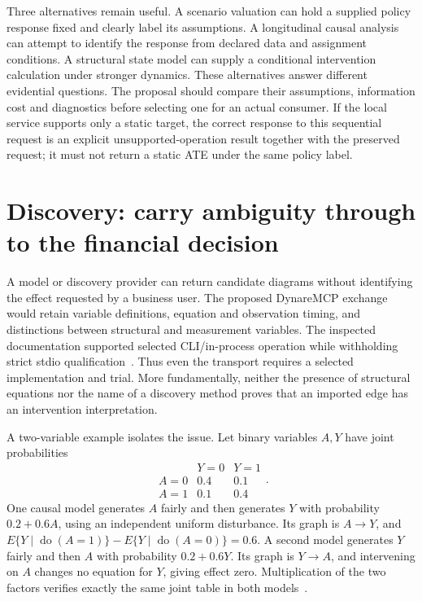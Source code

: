 Three alternatives remain useful. A scenario valuation can hold a supplied
policy response fixed and clearly label its assumptions. A longitudinal
causal analysis can attempt to identify the response from declared data and
assignment conditions. A structural state model can supply a conditional
intervention calculation under stronger dynamics. These alternatives answer
different evidential questions. The proposal should compare their assumptions,
information cost and diagnostics before selecting one for an actual consumer.
If the local service supports only a static target, the correct response to
this sequential request is an explicit unsupported-operation result together
with the preserved request; it must not return a static ATE under the same
policy label.


\section{Discovery: carry ambiguity through to the financial decision}

A model or discovery provider can return candidate diagrams without
identifying the effect requested by a business user. The proposed
DynareMCP exchange would retain variable definitions, equation and observation
timing, and distinctions between structural and measurement variables. The
inspected documentation supported selected CLI/in-process operation while
withholding strict stdio qualification~\citep{v12_in_inventory}. Thus even the
transport requires a selected implementation and trial. More fundamentally,
neither the presence of structural equations nor the name of a discovery
method proves that an imported edge has an intervention interpretation.

A two-variable example isolates the issue. Let binary variables $A,Y$ have
joint probabilities
\[
 \begin{array}{c|cc}
       &Y=0&Y=1\\\hline
 A=0&0.4&0.1\\
 A=1&0.1&0.4
 \end{array}.
\]
One causal model generates $A$ fairly and then generates $Y$ with probability
$0.2+0.6A$, using an independent uniform disturbance. Its graph is
$A\to Y$, and $E\{Y\mid\operatorname{do}(A=1)\}-
E\{Y\mid\operatorname{do}(A=0)\}=0.6$. A second model generates $Y$
fairly and then $A$ with probability $0.2+0.6Y$. Its graph is $Y\to A$,
and intervening on $A$ changes no equation for $Y$, giving effect zero.
Multiplication of the two factors verifies exactly the same joint table
in both models~\citep{exec13_i3_examples}.

